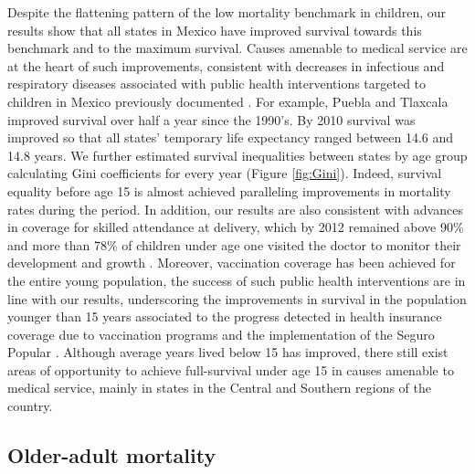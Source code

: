 \documentclass[11.5pt]{article}
\begin{document}
\begin{spacing}{1.5}
Despite the flattening pattern of the low mortality benchmark in children, our results show that all states in Mexico have improved survival towards this benchmark and to the maximum survival. Causes amenable to medical service are at the heart of such improvements, consistent with decreases in infectious and respiratory diseases associated with public health interventions targeted to children in Mexico previously documented \citep{sepulveda2006}. For example, Puebla and Tlaxcala improved survival over half a year since the 1990's. By 2010 survival was improved so that all states' temporary life expectancy ranged between 14.6 and 14.8 years. We further estimated survival inequalities between states by age group calculating Gini coefficients for every year (Figure \ref{fig:Gini}).  Indeed, survival equality before age 15 is almost achieved paralleling improvements in mortality rates during the period. In addition, our results are also consistent with advances in coverage for skilled attendance at delivery, which by 2012 remained above 90\% and more than 78\% of children under age one visited the doctor to monitor their development and growth  \citep{urquieta2015evolution}. Moreover, vaccination coverage has been achieved for the entire young population, the success of such public health interventions are in line with our results, underscoring the improvements in survival in the population younger than 15 years associated to the progress detected in health insurance coverage due to vaccination programs and the implementation of the Seguro Popular \citep{urquieta2015evolution}. Although average years lived below 15 has improved, there still exist areas of opportunity to achieve full-survival under age 15 in causes amenable to medical service, mainly in states in the Central and Southern regions of the country. 


\subsection*{Older-adult mortality}


\end{spacing}
\end{document}
